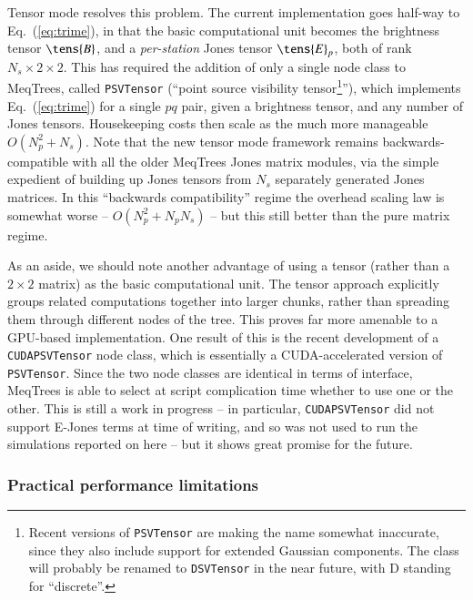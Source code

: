 \documentclass{aa}
\begin{document}
Tensor mode resolves this problem. The current implementation goes half-way to Eq.~(\ref{eq:trime}), in that the basic computational unit becomes the brightness tensor $\tens{B}$, and a \emph{per-station} Jones tensor $\tens{E}_p$, both of rank $N_s\times2\times2$. This has required the addition of only a single node class to MeqTrees, called {\tt PSVTensor} (``point source visibility tensor\footnote{Recent versions of {\tt PSVTensor} are making the name somewhat inaccurate, since they also include support for extended Gaussian components. The class will probably be renamed to {\tt DSVTensor} in the near future, with D standing for ``discrete''.}''), which implements Eq.~(\ref{eq:trime}) for a single $pq$ pair, given a brightness tensor, and any number of Jones tensors. Housekeeping costs then scale as the much more manageable $O(N_p^2+N_s)$. Note that the new tensor mode framework remains backwards-compatible with all the older MeqTrees Jones matrix modules, via the simple expedient of building up Jones tensors from $N_s$ separately generated Jones matrices. In this ``backwards compatibility'' regime the overhead scaling law is somewhat worse --  $O(N_p^2+N_p N_s)$ -- but this still better than the pure matrix regime. 

As an aside, we should note another advantage of using a tensor (rather than a $2\times2$ matrix) as the basic computational unit. The tensor approach explicitly groups related computations together into larger chunks, 
rather than spreading them through different nodes of the tree. This proves far more amenable to a GPU-based implementation. One result of this is the recent development of a {\tt CUDAPSVTensor} node class, which is 
essentially a CUDA-accelerated version of {\tt PSVTensor}. Since the two node classes are identical in terms of interface, MeqTrees is able to select at script complication time whether to use one or the other. This is still a work in progress -- in particular, {\tt CUDAPSVTensor} did not support E-Jones terms at time of writing, and so was not used to run the simulations reported on here -- but it shows great promise for the future.


\subsubsection{Practical performance limitations}
\label{sec:performance}
\end{document}
